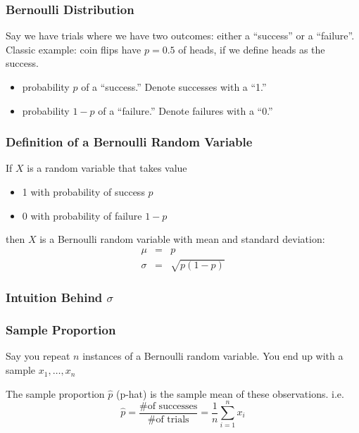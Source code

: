 \documentclass[slides]{beamer}
\newcommand{\blue}[1]{\textcolor{blue2}{#1}}
\begin{document}
\begin{frame}
\frametitle{Bernoulli Distribution}

Say we have trials where we have two outcomes:  either a ``success'' or a ``failure''.  Classic example:  coin flips have $p=0.5$ of heads, if we define heads as the success.

\vspace{0.5cm}

\begin{itemize}
\item probability $p$ of a ``success.''  Denote successes with a ``1.''
\item probability $1-p$ of a ``failure.''  Denote failures with a ``0.''
\end{itemize}


\end{frame}


\begin{frame}[fragile]
\frametitle{Definition of a Bernoulli Random Variable}

If $X$ is a random variable that takes value
\begin{itemize}
\item 1 with probability of success $p$
\item 0 with probability of failure $1-p$
\end{itemize}

then $X$ is a \blue{Bernoulli random variable} with mean and standard deviation:
\begin{eqnarray*}
\mu &=& p\\
\sigma &=& \sqrt{p(1-p)}
\end{eqnarray*}

\end{frame}


\begin{frame}[fragile]
\frametitle{Intuition Behind $\sigma$}


\end{frame}


\begin{frame}[fragile]
\frametitle{Sample Proportion}
Say you repeat $n$ instances of a Bernoulli random variable.  You end up with a sample $x_1, \ldots, x_{n}$

\vspace{0.5cm}

The \blue{sample proportion $\widehat{p}$} (p-hat) is the sample mean of these observations.  i.e. \[
\widehat{p} = \frac{\mbox{\# of successes}}{\mbox{\# of trials}} = \frac{1}{n}\sum_{i=1}^{n}x_i
\]

\end{frame}
\end{document}

